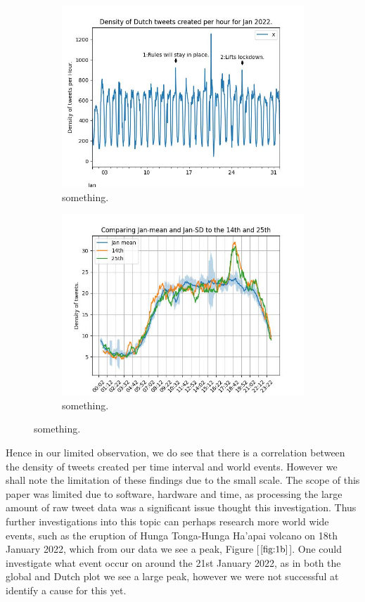 \documentclass[9pt]{article}
\begin{document}
\begin{figure}[h!]
    \center
    \begin{subfigure}[b]{0.45\textwidth}
        \includegraphics[scale=0.34]{figures/figNL60AnnoAX.jpeg}
        \caption{something.}
        \label{fig:3a}
    \end{subfigure}
    \begin{subfigure}[b]{0.45\textwidth}
        \includegraphics[scale=0.34]{figures/figNLComp.jpeg}
        \caption{something.}
        \label{fig:3b}
    \end{subfigure}
\end{figure}

Hence in our limited observation, we do see that there is a correlation between the
density of tweets created per time interval and world events. However we shall note the
limitation of these findings due to the small scale. The scope of this paper was limited
due to software, hardware and time, as processing the large amount of raw tweet data was a
significant issue thought this investigation. Thus further investigations into this topic
can perhaps research more world wide events, such as the eruption of Hunga Tonga-Hunga Ha'apai
volcano on 18th January 2022, which from our data we see a peak, Figure [$\ref{fig:1b}$].
One could investigate what event occur on around the 21st January 2022, as in both the
global and Dutch plot we see a large peak, however we were not successful at identify a
cause for this yet.
\end{document}
